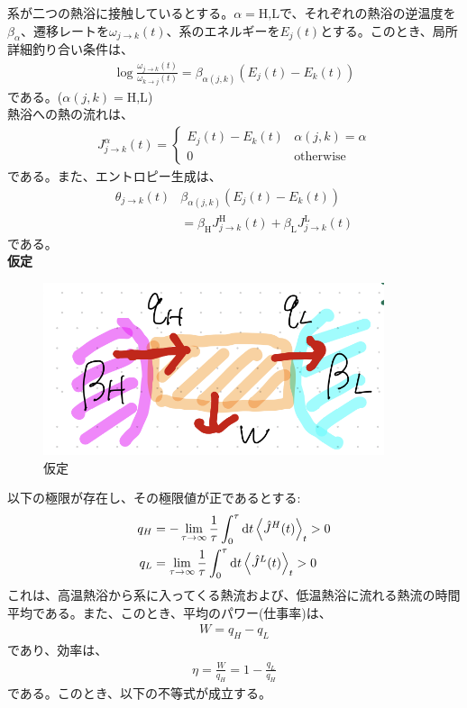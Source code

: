 \documentclass[a4paper,11pt]{jsarticle}
\numberwithin{equation}{section}
\begin{document}
系が二つの熱浴に接触しているとする。$\alpha = \text{H,L}$で、それぞれの熱浴の逆温度を$\beta_{\alpha}$、遷移レートを$\omega_{j \to k}(t)$、系のエネルギーを$E_j(t)$とする。このとき、局所詳細釣り合い条件は、
\begin{align}
  \log \frac{\omega_{j \to k}(t)}{\omega_{k \to j}(t)} = \beta_{\alpha(j,k)}(E_j(t) - E_k(t))
\end{align}
である。($\alpha(j,k) = \text{H,L}$)\\
熱浴への熱の流れは、
\begin{align}
  {J}^{\alpha}_{j\to k}(t) =
  \begin{cases}
    E_j(t) - E_k(t) & \alpha(j,k) = \alpha\\
    0 & \text{otherwise}
    \end{cases}
\end{align}
である。また、エントロピー生成は、
\begin{align}
  \theta_{j \to k}(t) & \beta_{\alpha(j,k)}(E_j(t) - E_k(t))\\
    &= \beta_{\text{H}}J^{\text{H}}_{j\to k}(t) + \beta_{\text{L}}J^{\text{L}}_{j\to k}(t)
\end{align}
である。\\
\textbf{仮定}\\
\begin{figure}[H]
    \begin{center}
    \includegraphics[width=100mm]{set2.png}
    \end{center}
    \caption{仮定}
    \label{fig:set2}
\end{figure}

以下の極限が存在し、その極限値が正であるとする:
\begin{align}
  q_H &= -\lim_{\tau \to \infty}\frac{1}{\tau}\int_0^{\tau} \dd{t}\ev{\hat{J}^H(t)}_t>0\\
  q_L &= \lim_{\tau \to \infty}\frac{1}{\tau}\int_0^{\tau} \dd{t}\ev{\hat{J}^L(t)}_t>0
\end{align}
これは、高温熱浴から系に入ってくる熱流および、低温熱浴に流れる熱流の時間平均である。また、このとき、平均のパワー(仕事率)は、
\begin{align}
  W = q_H - q_L
\end{align}
であり、効率は、
\begin{align}
  \eta = \frac{W}{q_H} = 1 - \frac{q_L}{q_H}
\end{align}
である。このとき、以下の不等式が成立する。
\end{document}
